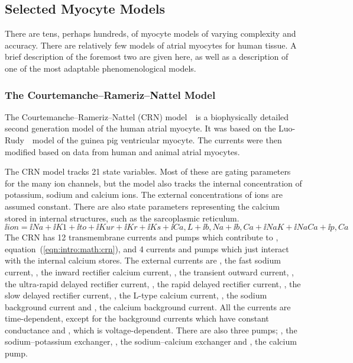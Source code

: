 \subsection{Selected Myocyte Models}

There are tens, perhaps hundreds, of myocyte models of varying complexity and
accuracy.
There are relatively few models of atrial myocytes for human tissue.
A brief description of the foremost two are given here, as well as a description
of one of the most adaptable phenomenological models.

\subsubsection{The Courtemanche--Rameriz--Nattel Model}
\label{sec:intro:math:crn}

The Courtemanche--Rameriz--Nattel (CRN) model~\cite{CRN98}\ is a biophysically
detailed second generation model of the human atrial myocyte.
It was based on the Luo-Rudy~\cite{Luo1994}\ model of the guinea pig ventricular
myocyte.
The currents were then modified based on data from human and animal atrial
myocytes.

The CRN model tracks 21 state variables.
Most of these are gating parameters for the many ion channels, but the model
also tracks the internal concentration of potassium, sodium and calcium ions.
The external concentrations of ions are assumed constant.
There are also state parameters representing the calcium stored in internal
structures, such as the sarcoplasmic reticulum.
\begin{equation}
\label{eqn:intro:math:crn}
\ii{ion} = \ii{Na} + \ii{K1} + \ii{to} + \ii{Kur} + \ii{Kr} + \ii{Ks} +
\ii{Ca,L} + \ii{b,Na} + \ii{b,Ca} + \ii{NaK} + \ii{NaCa} + \ii{p,Ca}
\end{equation}
The CRN has 12 transmembrane currents and pumps which contribute to ,
equation~(\ref{eqn:intro:math:crn}), and 4 currents and
pumps which just interact with the internal calcium stores.
The external currents are , the fast sodium current, , the inward
rectifier calcium current, , the transient outward current, , the
ultra-rapid delayed rectifier current, , the rapid delayed rectifier
current, , the slow delayed rectifier current, , the L-type
calcium current, , the sodium background current and , the
calcium background current.
All the currents are time-dependent, except for the background currents which
have constant conductance and , which is voltage-dependent.
There are also three pumps; , the sodium--potassium exchanger,
, the sodium--calcium exchanger and , the calcium pump.

